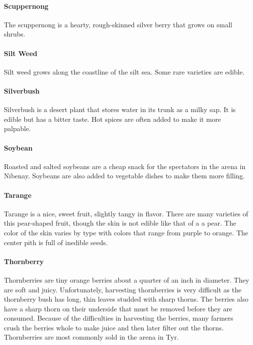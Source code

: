 \begin{multicols}{2}
\paragraph{Scuppernong} The scuppernong is a hearty, rough-skinned silver berry that grows on small shrubs.\\
\paragraph{Silt Weed} Silt weed grows along the coastline of the silt sea. Some rare varieties are edible.\\
\paragraph{Silverbush} Silverbush is a desert plant that stores water in its trunk as a milky sap. It is edible but has a bitter taste. Hot spices are often added to make it more palpable.\\
\paragraph{Soybean} Roasted and salted soybeans are a cheap snack for the spectators in the arena in Nibenay. Soybeans are also added to vegetable dishes to make them more filling.\\
\paragraph{Tarange} Tarange is a nice, sweet fruit, slightly tangy in flavor. There are many varieties of this pear-shaped fruit, though the skin is not edible like that of a a pear. The color of the skin varies by type with colors that range from purple to orange. The center pith is full of inedible seeds.\\
\paragraph{Thornberry} Thornberries are tiny orange berries about a quarter of an inch in diameter. They are soft and juicy. Unfortunately, harvesting thornberries is very difficult as the thornberry bush has long, thin leaves studded with sharp thorns. The berries also have a sharp thorn on their underside that must be removed before they are consumed. Because of the difficulties in harvesting the berries, many farmers crush the berries whole to make juice and then later filter out the thorns. Thornberries are most commonly sold in the arena in Tyr.\\

\end{multicols}
